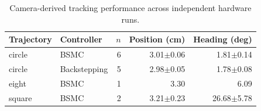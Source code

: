 \begin{table}[!t]
\centering
\caption{Camera-derived tracking performance across independent hardware runs.}
\label{tab:tracking}
\begin{tabular}{llrrr}
\hline
Trajectory & Controller & $n$ & Position (cm) & Heading (deg) \\
\hline
circle & BSMC & 6 & 3.01$\pm$0.06 & 1.81$\pm$0.14 \\
circle & Backstepping & 5 & 2.98$\pm$0.05 & 1.78$\pm$0.08 \\
eight & BSMC & 1 & 3.30 & 6.09 \\
square & BSMC & 2 & 3.21$\pm$0.23 & 26.68$\pm$5.78 \\
\hline
\end{tabular}
\end{table}
